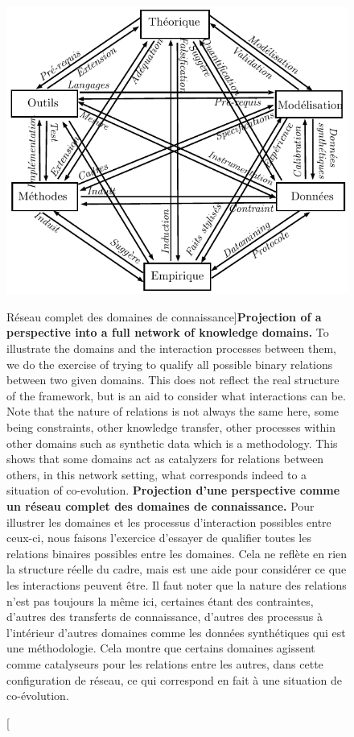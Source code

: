 \begin{figure}[h!]
\includegraphics[width=\linewidth]{Figures/KnowledgeFramework/framework_fr.pdf}
\caption[Full network of knowledge domains][Réseau complet des domaines de connaissance]{\textbf{Projection of a perspective into a full network of knowledge domains.} To illustrate the domains and the interaction processes between them, we do the exercise of trying to qualify all possible binary relations between two given domains. This does not reflect the real structure of the framework, but is an aid to consider what interactions can be. Note that the nature of relations is not always the same here, some being constraints, other knowledge transfer, other processes within other domains such as synthetic data which is a methodology. This shows that some domains act as catalyzers for relations between others, in this network setting, what corresponds indeed to a situation of co-evolution.\label{fig:knowledgeframework:fwk}
}{\textbf{Projection d'une perspective comme un réseau complet des domaines de connaissance.} Pour illustrer les domaines et les processus d'interaction possibles entre ceux-ci, nous faisons l'exercice d'essayer de qualifier toutes les relations binaires possibles entre les domaines. Cela ne reflète en rien la structure réelle du cadre, mais est une aide pour considérer ce que les interactions peuvent être. Il faut noter que la nature des relations n'est pas toujours la même ici, certaines étant des contraintes, d'autres des transferts de connaissance, d'autres des processus à l'intérieur d'autres domaines comme les données synthétiques qui est une méthodologie. Cela montre que certains domaines agissent comme catalyseurs pour les relations entre les autres, dans cette configuration de réseau, ce qui correspond en fait à une situation de co-évolution.\label{fig:knowledgeframework:fwk}}
\end{figure}




